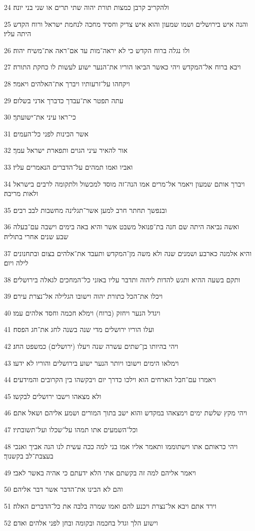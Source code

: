 \par 24 ולהקריב קרבן כמצות תורת יהוה שתי תרים או שני בני יונה׃
\par 25 והנה איש בירושלים ושמו שמעון והוא איש צדיק וחסיד מחכה לנחמת ישראל ורוח הקדש היתה עליו׃
\par 26 ולו נגלה ברוח הקדש כי לא יראה־מות עד אם־ראה את־משיח יהוה׃
\par 27 ויבא ברוח אל־המקדש ויהי כאשר הביאו הוריו את־הנער ישוע לעשות לו כחקת התורה׃
\par 28 ויקחהו על־זרעותיו ויברך את־האלהים ויאמר׃
\par 29 עתה תפטר את־עבדך כדברך אדני בשלום׃
\par 30 כי־ראו עיני את־ישועתך׃
\par 31 אשר הכינות לפני כל־העמים׃
\par 32 אור להאיר עיני הגוים ותפארת ישראל עמך׃
\par 33 ואביו ואמו תמהים על־הדברים הנאמרים עליו׃
\par 34 ויברך אותם שמעון ויאמר אל־מרים אמו הנה־זה מוסד למכשול ולתקומה לרבים בישראל ולאות מריבה׃
\par 35 ובנפשך תחתר חרב למען אשר־תגלינה מחשבות לבב רבים׃
\par 36 ואשה נביאה היתה שם חנה בת־פנואל משבט אשר והיא באה בימים וישבה עם־בעלה שבע שנים אחרי בתוליה׃
\par 37 והיא אלמנה כארבע ושמנים שנה ולא משה מן־המקדש ותעבד את־אלהים בצום ובתחנונים לילה ויום׃
\par 38 ותקם בשעה ההיא ותגש להדות ליהוה ותדבר עליו באזני כל־המחכים לגאלה בירושלים׃
\par 39 ויכלו את־הכל כתורת יהוה וישובו הגלילה אל־נצרת עירם׃
\par 40 ויגדל הנער ויחזק (ברוח) וימלא חכמה וחסד אלהים עמו׃
\par 41 ועלו הוריו ירושלים מדי שנה בשנה לחג את־חג הפסח׃
\par 42 ויהי בהיותו בן־שתים עשרה שנה ויעלו (ירושלים) כמשפט החג׃
\par 43 וימלאו הימים וישובו ויותר הנער ישוע בירושלים והוריו לא ידעו׃
\par 44 ויאמרו עם־חבל הארחים הוא וילכו כדרך יום ויבקשהו בין הקרובים והמידעים׃
\par 45 ולא מצאהו וישבו ירושלים לבקשו׃
\par 46 ויהי מקץ שלשת ימים וימצאהו במקדש והוא ישב בתוך המורים ושמע אליהם ושאל אתם׃
\par 47 וכל־השמעים אתו תמהו על־שכלו ועל־תשובתיו׃
\par 48 ויהי כראותם אתו וישתוממו ותאמר אליו אמו בני למה ככה עשית לנו הנה אביך ואנכי בעצבת־לב בקשנוך׃
\par 49 ויאמר אליהם למה זה בקשתם אתי הלא ידעתם כי אהיה באשר לאבי׃
\par 50 והם לא הבינו את־הדבר אשר דבר אליהם׃
\par 51 וירד אתם ויבא אל־נצרת ויכנע להם ואמו שמרה בלבה את כל־הדברים האלה׃
\par 52 וישוע הלך וגדל בחכמה ובקומה ובחן לפני אלהים ואדם׃

